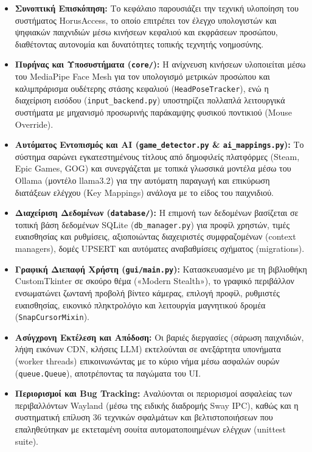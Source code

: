 \documentclass[twoside, a4paper, 11pt]{article}
\newcommand{\textlatin}[1]{\textenglish{#1}}
\begin{document}
\begin{itemize}
    \item \textbf{Συνοπτική Επισκόπηση:} Το κεφάλαιο παρουσιάζει την τεχνική υλοποίηση του συστήματος \textlatin{HorusAccess}, το οποίο επιτρέπει τον έλεγχο υπολογιστών και ψηφιακών παιχνιδιών μέσω κινήσεων κεφαλιού και εκφράσεων προσώπου, διαθέτοντας αυτονομία και δυνατότητες τοπικής τεχνητής νοημοσύνης.
    \item \textbf{Πυρήνας και Υποσυστήματα (\texttt{core/}):} Η ανίχνευση κινήσεων υλοποιείται μέσω του \textlatin{MediaPipe Face Mesh} για τον υπολογισμό μετρικών προσώπου και καλιμπράρισμα ουδέτερης στάσης κεφαλιού (\texttt{HeadPoseTracker}), ενώ η διαχείριση εισόδου (\texttt{input\_backend.py}) υποστηρίζει πολλαπλά λειτουργικά συστήματα με μηχανισμό προσωρινής παράκαμψης φυσικού ποντικιού (\textlatin{Mouse Override}).
    \item \textbf{Αυτόματος Εντοπισμός και AI (\texttt{game\_detector.py} \& \texttt{ai\_mappings.py}):} Το σύστημα σαρώνει εγκατεστημένους τίτλους από δημοφιλείς πλατφόρμες (\textlatin{Steam, Epic Games, GOG}) και συνεργάζεται με τοπικά γλωσσικά μοντέλα μέσω του \textlatin{Ollama} (μοντέλο \textlatin{llama3.2}) για την αυτόματη παραγωγή και επικύρωση διατάξεων ελέγχου (\textlatin{Key Mappings}) ανάλογα με το είδος του παιχνιδιού.
    \item \textbf{Διαχείριση Δεδομένων (\texttt{database/}):} Η επιμονή των δεδομένων βασίζεται σε τοπική βάση δεδομένων \textlatin{SQLite} (\texttt{db\_manager.py}) για προφίλ χρηστών, τιμές ευαισθησίας και ρυθμίσεις, αξιοποιώντας διαχειριστές συμφραζομένων (\textlatin{context managers}), δομές \textlatin{UPSERT} και αυτόματες αναβαθμίσεις σχήματος (\textlatin{migrations}).
    \item \textbf{Γραφική Διεπαφή Χρήστη (\texttt{gui/main.py}):} Κατασκευασμένο με τη βιβλιοθήκη \textlatin{CustomTkinter} σε σκούρο θέμα («\textlatin{Modern Stealth}»), το γραφικό περιβάλλον ενσωματώνει ζωντανή προβολή βίντεο κάμερας, επιλογή προφίλ, ρυθμιστές ευαισθησίας, εικονικό πληκτρολόγιο και λειτουργία μαγνητικού δρομέα (\texttt{SnapCursorMixin}).
    \item \textbf{Ασύγχρονη Εκτέλεση και Απόδοση:} Οι βαριές διεργασίες (σάρωση παιχνιδιών, λήψη εικόνων \textlatin{CDN}, κλήσεις \textlatin{LLM}) εκτελούνται σε ανεξάρτητα υπονήματα (\textlatin{worker threads}) επικοινωνώντας με το κύριο νήμα μέσω ασφαλών ουρών (\texttt{queue.Queue}), αποτρέποντας τα παγώματα του \textlatin{UI}.
    \item \textbf{Περιορισμοί και Bug Tracking:} Αναλύονται οι περιορισμοί ασφαλείας των περιβαλλόντων \textlatin{Wayland} (μέσω της ειδικής διαδρομής \textlatin{Sway IPC}), καθώς και η συστηματική επίλυση 36 τεχνικών σφαλμάτων και βελτιστοποιήσεων που επαληθεύτηκαν με εκτεταμένη σουίτα αυτοματοποιημένων ελέγχων (\textlatin{unittest suite}).
\end{itemize}
\end{document}
